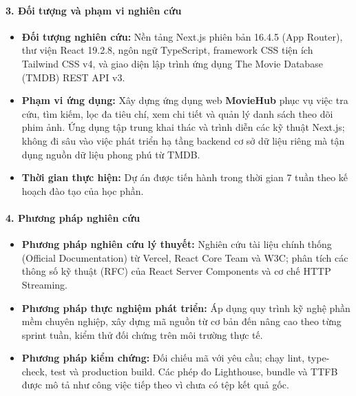 \documentclass[12pt,a4paper]{extarticle}
\begin{document}
\paragraph*{3. Đối tượng và phạm vi nghiên cứu}
\begin{itemize}[noitemsep]
    \item \textbf{Đối tượng nghiên cứu:} Nền tảng Next.js phiên bản 16.4.5 (App Router), thư viện React 19.2.8, ngôn ngữ TypeScript, framework CSS tiện ích Tailwind CSS v4, và giao diện lập trình ứng dụng The Movie Database (TMDB) REST API v3.
    \item \textbf{Phạm vi ứng dụng:} Xây dựng ứng dụng web \textbf{MovieHub} phục vụ việc tra cứu, tìm kiếm, lọc đa tiêu chí, xem chi tiết và quản lý danh sách theo dõi phim ảnh. Ứng dụng tập trung khai thác và trình diễn các kỹ thuật Next.js; không đi sâu vào việc phát triển hạ tầng backend cơ sở dữ liệu riêng mà tận dụng nguồn dữ liệu phong phú từ TMDB.
    \item \textbf{Thời gian thực hiện:} Dự án được tiến hành trong thời gian 7 tuần theo kế hoạch đào tạo của học phần.
\end{itemize}

\paragraph*{4. Phương pháp nghiên cứu}
\begin{itemize}[noitemsep]
    \item \textbf{Phương pháp nghiên cứu lý thuyết:} Nghiên cứu tài liệu chính thống (Official Documentation) từ Vercel, React Core Team và W3C; phân tích các thông số kỹ thuật (RFC) của React Server Components và cơ chế HTTP Streaming.
    \item \textbf{Phương pháp thực nghiệm phát triển:} Áp dụng quy trình kỹ nghệ phần mềm chuyên nghiệp, xây dựng mã nguồn từ cơ bản đến nâng cao theo từng sprint tuần, kiểm thử đối chứng trên môi trường thực tế.
    \item \textbf{Phương pháp kiểm chứng:} Đối chiếu mã với yêu cầu; chạy lint, type-check, test và production build. Các phép đo Lighthouse, bundle và TTFB được mô tả như công việc tiếp theo vì chưa có tệp kết quả gốc.
\end{itemize}
\end{document}
